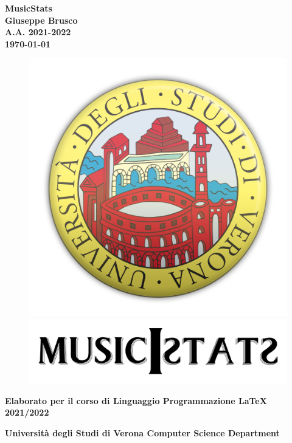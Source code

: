 \documentclass[12pt]{article}
\title{}
\author{Giuseppe Brusco}
\begin{document}
\begin{titlepage}
   \begin{center}
       \vspace{1cm}
	\large
      {\huge \textbf{MusicStats}}\\
       \vspace{1.5cm}
       \textbf{Giuseppe Brusco}\\
       \vspace{1.5cm}
	\textbf{A.A. 2021-2022}\\
	\vspace{0.35cm}
	\textbf{\today}
\vfill
\begin{figure}[h!]
	\begin{center}
	  \includegraphics[scale=0.3]{media/univr}
	  \includegraphics[scale=0.3]{media/musicStats}
	\end{center}
\end{figure}
	\vfill
 	\textbf{Elaborato per il corso di Linguaggio Programmazione LaTeX 2021/2022}
       \vspace{3cm}
      \begin{multicols}{2}
      \textbf{Università degli Studi di Verona Computer Science Department}
	\end{multicols}
   \end{center}
\end{titlepage}
\end{document}
